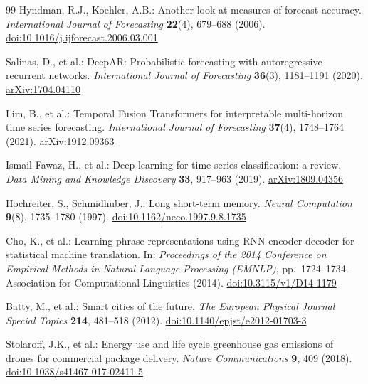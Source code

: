 \documentclass[runningheads,a4paper]{llncs}
\begin{document}
\begin{thebibliography}{99}
Hyndman, R.J., Koehler, A.B.: Another look at measures of forecast accuracy. \textit{International Journal of Forecasting} \textbf{22}(4), 679--688 (2006). \href{https://doi.org/10.1016/j.ijforecast.2006.03.001}{doi:10.1016/j.ijforecast.2006.03.001}

Salinas, D., et al.: DeepAR: Probabilistic forecasting with autoregressive recurrent networks. \textit{International Journal of Forecasting} \textbf{36}(3), 1181--1191 (2020). \href{https://arxiv.org/abs/1704.04110}{arXiv:1704.04110}

Lim, B., et al.: Temporal Fusion Transformers for interpretable multi-horizon time series forecasting. \textit{International Journal of Forecasting} \textbf{37}(4), 1748--1764 (2021). \href{https://arxiv.org/abs/1912.09363}{arXiv:1912.09363}

Ismail Fawaz, H., et al.: Deep learning for time series classification: a review. \textit{Data Mining and Knowledge Discovery} \textbf{33}, 917--963 (2019). \href{https://arxiv.org/abs/1809.04356}{arXiv:1809.04356}

Hochreiter, S., Schmidhuber, J.: Long short-term memory. \textit{Neural Computation} \textbf{9}(8), 1735--1780 (1997). \href{https://doi.org/10.1162/neco.1997.9.8.1735}{doi:10.1162/neco.1997.9.8.1735}

Cho, K., et al.: Learning phrase representations using RNN encoder-decoder for statistical machine translation. In: \textit{Proceedings of the 2014 Conference on Empirical Methods in Natural Language Processing (EMNLP)}, pp.~1724--1734. Association for Computational Linguistics (2014). \href{https://doi.org/10.3115/v1/D14-1179}{doi:10.3115/v1/D14-1179}

Batty, M., et al.: Smart cities of the future. \textit{The European Physical Journal Special Topics} \textbf{214}, 481--518 (2012). \href{https://doi.org/10.1140/epjst/e2012-01703-3}{doi:10.1140/epjst/e2012-01703-3}

Stolaroff, J.K., et al.: Energy use and life cycle greenhouse gas emissions of drones for commercial package delivery. \textit{Nature Communications} \textbf{9}, 409 (2018). \href{https://doi.org/10.1038/s41467-017-02411-5}{doi:10.1038/s41467-017-02411-5}

\end{thebibliography}
\end{document}
